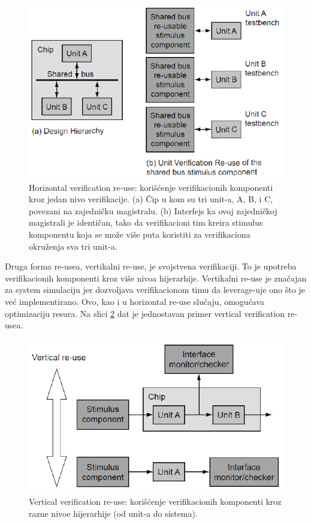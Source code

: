\documentclass[a4paper, 12pt]{article}
\begin{document}
\begin{figure}[h!]
\centering
\includegraphics[scale=0.5]{img7.png}
\caption{Horizontal verification re-use: korišćenje verifikacionih komponenti kroz jedan nivo verifikacije. (a) Čip u kom su tri unit-a, A, B, i C, povezani na zajedničku magistralu. (b) Interfejs ka ovoj zajedničkoj magistrali je identičan, tako da verifikacioni tim kreira stimulus komponentu koja se može više puta koristiti za verifikaciona okruženja sva tri unit-a.}
\label{img7}
\end{figure}
\indent Druga forma re-usea, vertikalni re-use, je svojstvena verifikaciji. To je upotreba verifikacionih komponenti kroz više nivoa hijerarhije. Vertikalni re-use je značajan za system simulaciju jer dozvoljava verifikacionom timu da leverage-uje ono što je već implementirano. Ovo, kao i u horizontal re-use slučaju, omogućava optimizaciju resura. Na slici \ref{img8} dat je jednostavan primer vertical verification re-usea.\\
\begin{figure}[h!]
\centering
\includegraphics[scale=0.5]{img8.png}
\caption{Vertical verification re-use: korišćenje verifikacionih komponenti kroz razne nivoe hijerarhije (od unit-a do sistema).}
\label{img8}
\end{figure}
\end{document}
